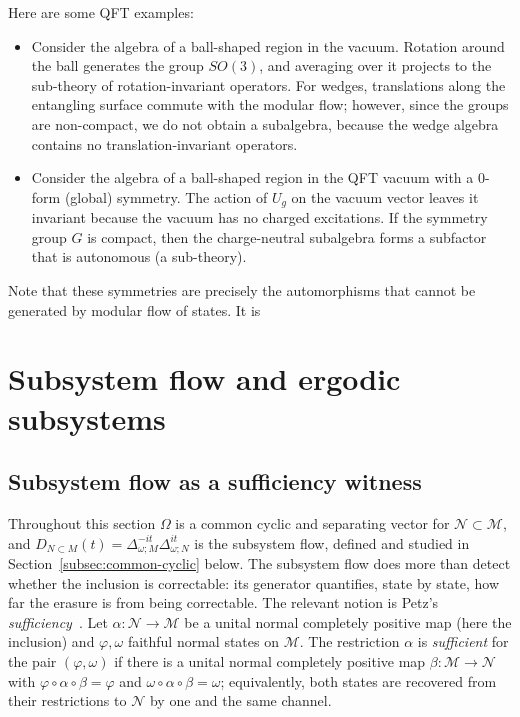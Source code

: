 \documentclass[a4paper,11pt]{article}
\theoremstyle{definition}
\begin{document}
Here are some QFT examples:
\begin{itemize}
    \item Consider the algebra of a ball-shaped region in the vacuum. Rotation around the ball generates the group $SO(3)$, and averaging over it projects to the sub-theory of rotation-invariant operators. For wedges, translations along the entangling surface commute with the modular flow; however, since the groups are non-compact, we do not obtain a subalgebra, because the wedge algebra contains no translation-invariant operators.

    \item Consider the algebra of a ball-shaped region in the QFT vacuum with a $0$-form (global) symmetry. The action of $U_g$ on the vacuum vector leaves it invariant because the vacuum has no charged excitations. If the symmetry group $G$ is compact, then the charge-neutral subalgebra forms a subfactor that is autonomous (a sub-theory).
\end{itemize}
Note that these symmetries are precisely the automorphisms that cannot be generated by modular flow of states. It is 


\section{Subsystem flow and ergodic subsystems}\label{sec:ergodic}








\subsection{Subsystem flow as a sufficiency witness}\label{subsec:QEC-sufficiency}

Throughout this section $\Omega$ is a common cyclic and separating vector for $\mathcal N\subset\mathcal M$, and $D_{N\subset M}(t)=\Delta_{\omega;M}^{-it}\Delta_{\omega;N}^{it}$ is the subsystem flow, defined and studied in Section~\ref{subsec:common-cyclic} below. The subsystem flow does more than detect whether the inclusion is correctable: its generator quantifies, state by state, how far the erasure is from being correctable. The relevant notion is Petz's \emph{sufficiency}~\cite{Petz1986,Petz1988,OhyaPetz1993}. Let $\alpha:\mathcal N\to\mathcal M$ be a unital normal completely positive map (here the inclusion) and $\varphi,\omega$ faithful normal states on $\mathcal M$. The restriction $\alpha$ is \emph{sufficient} for the pair $(\varphi,\omega)$ if there is a unital normal completely positive map $\beta:\mathcal M\to\mathcal N$ with $\varphi\circ\alpha\circ\beta=\varphi$ and $\omega\circ\alpha\circ\beta=\omega$; equivalently, both states are recovered from their restrictions to $\mathcal N$ by one and the same channel.
\end{document}

